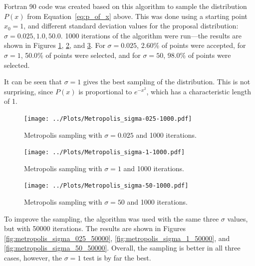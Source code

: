 \documentclass[twocolumn]{myarticle}
\begin{document}
Fortran 90 code was created based on this algorithm to sample the distribution $ P(x) $ from Equation~\eqref{eq:p_of_x} above.
This was done using a starting point $ x_0 = 1 $, and different standard deviation values for the proposal distribution: $ \sigma = 0.025, 1.0, 50.0 $.
1000 iterations of the algorithm were run---the results are shown in Figures \ref{fig:metropolis_sigma_025_1000}, \ref{fig:metropolis_sigma_1_1000}, and \ref{fig:metropolis_sigma_50_1000}.
For $ \sigma = 0.025 $, 2.60\% of points were accepted, for $ \sigma = 1 $, 50.0\% of points were selected, and for $ \sigma = 50 $, 98.0\% of points were selected.

It can be seen that $ \sigma = 1 $ gives the best sampling of the distribution.
This is not surprising, since $ P(x) $ is proportional to $ e^{-x^2} $, which has a characteristic length of 1.

\begin{figure}[ht!]
    \begin{center}
    \texttt{[image: ../Plots/Metropolis\_sigma-025-1000.pdf]}
    \caption{%
    Metropolis sampling with $ \sigma = 0.025 $ and 1000 iterations.
    }
    \label{fig:metropolis_sigma_025_1000}
    \end{center}
\end{figure}

\begin{figure}[ht!]
    \begin{center}
    \texttt{[image: ../Plots/Metropolis\_sigma-1-1000.pdf]}
    \caption{%
    Metropolis sampling with $ \sigma = 1 $ and 1000 iterations.
    }
    \label{fig:metropolis_sigma_1_1000}
    \end{center}
\end{figure}

\begin{figure}[ht!]
    \begin{center}
    \texttt{[image: ../Plots/Metropolis\_sigma-50-1000.pdf]}
    \caption{%
    Metropolis sampling with $ \sigma = 50 $ and 1000 iterations.
    }
    \label{fig:metropolis_sigma_50_1000}
    \end{center}
\end{figure}

To improve the sampling, the algorithm was used with the same three $ \sigma $ values, but with 50000 iterations.
The results are shown in Figures \ref{fig:metropolis_sigma_025_50000}, \ref{fig:metropolis_sigma_1_50000}, and \ref{fig:metropolis_sigma_50_50000}.
Overall, the sampling is better in all three cases, however, the $ \sigma = 1 $ test is by far the best.
\end{document}
